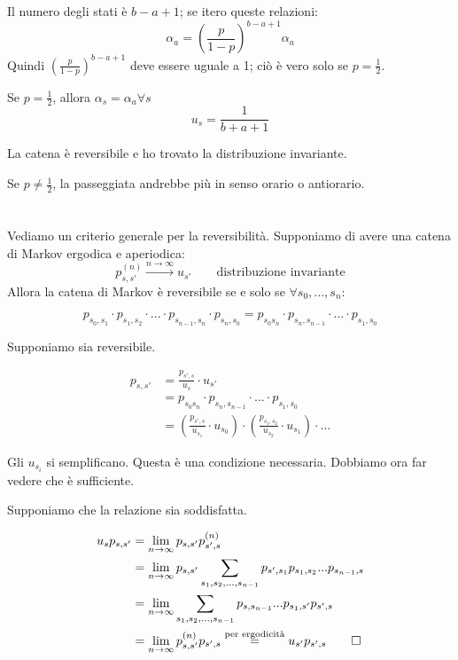 \documentclass[a4paper,12pt]{book}
\begin{document}
Il numero degli stati è $ b-a+1 $; se itero queste relazioni:
$$ \alpha_a = \left(\frac{p}{1-p}\right)^{b-a+1}\alpha_a $$
Quindi $ \left(\frac{p}{1-p}\right)^{b-a+1} $ deve essere uguale a 1; ciò è vero solo se $ p = \frac{1}{2} $.

Se $ p = \frac{1}{2} $, allora $ \alpha_s = \alpha_a \forall s $
$$ u_s = \frac{1}{b+a+1}$$

La catena è reversibile e ho trovato la distribuzione invariante. 

Se $ p \ne \frac{1}{2} $, la passeggiata andrebbe più in senso orario o antiorario.
\\
\\
\\
Vediamo un criterio generale per la reversibilità. Supponiamo di avere una catena di Markov ergodica e aperiodica:
$$ p_{s,s'}^{(n)} \overset{n \to \infty}{\longrightarrow} u_{s'} \qquad \text{distribuzione invariante} $$
Allora la catena di Markov è reversibile se e solo se $ \forall s_0, ..., s_n $:

$$ p_{s_0,s_1} \cdot p_{s_1, s_2} \cdot ... \cdot p_{s_{n-1}, s_n} \cdot p_{s_n , s_0} = p_{s_0 s_n} \cdot p_{s_n, s_{n-1}} \cdot ... \cdot p_{s_1, s_0} $$

Supponiamo sia reversibile.

\begin{align*}
	p_{s,s'} & = \frac{p_{s',s}}{u_s}\cdot u_{s'} \\
	& = p_{s_0 s_n} \cdot p_{s_n, s_{n-1}} \cdot ... \cdot p_{s_1, s_0} \\
	& = \left(\frac{p_{s', s}}{u_{s_1}}\cdot u_{s_0}\right) \cdot \left(\frac{p_{s_1, s_2}}{u_{s_2}}\cdot u_{s_1}\right) \cdot ...
\end{align*}

Gli $ u_{s_i} $ si semplificano. Questa è una condizione necessaria. Dobbiamo ora far vedere che è sufficiente. 

Supponiamo che la relazione sia soddisfatta.

\begin{align*}
	u_s p_{s,s'} & = \lim\limits_{n \to \infty} p_{s,s'}p_{s',s}^{(n)} \\
	& = \lim\limits_{n \to \infty} p_{s,s'} \sum_{s_1, s_2, ..., s_{n-1}} p_{s',s_1} p_{s_1, s_2} ... p_{s_{n-1}, s} \\
	& = \lim\limits_{n \to \infty} \sum_{s_1, s_2, ..., s_{n-1}} p_{s,s_{n-1}} ... p_{s_1, s'}p_{s',s} \\
	& = \lim\limits_{n \to \infty} p_{s,s'}^{(n)} p_{s',s} \overset{\text{per ergodicità}}{=} u_{s'} p_{s',s} \qed
\end{align*}
\end{document}
